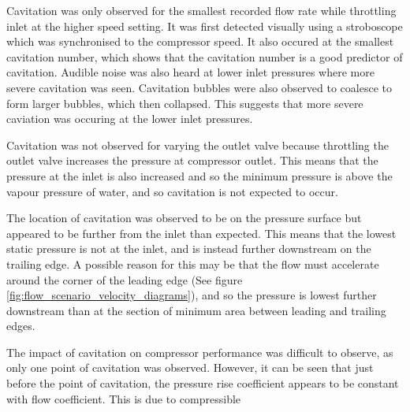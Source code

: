 \documentclass{article}
\begin{document}

Cavitation was only observed for the smallest recorded flow rate while throttling inlet at the higher speed setting.
It was first detected visually using a stroboscope which was synchronised to the compressor speed.
It also occured at the smallest cavitation number, which shows that the cavitation number is a good predictor of cavitation.
Audible noise was also heard at lower inlet pressures where more severe cavitation was seen.
Cavitation bubbles were also observed to coalesce to form larger bubbles, which then collapsed.
This suggests that more severe caviation was occuring at the lower inlet pressures.

Cavitation was not observed for varying the outlet valve because throttling the outlet valve increases the pressure at compressor outlet.
This means that the pressure at the inlet is also increased and so the minimum pressure is above the vapour pressure of water,
and so cavitation is not expected to occur.

The location of cavitation was observed to be on the pressure surface but appeared to be further from the inlet than expected.
This means that the lowest static pressure is not at the inlet, and is instead further downstream on the trailing edge.
A possible reason for this may be that the flow must accelerate around the corner of the leading edge (See figure \ref{fig:flow_scenario_velocity_diagrams}), and so the pressure is
lowest further downstream than at the section of minimum area between leading and trailing edges.

The impact of cavitation on compressor performance was difficult to observe, as only one point of cavitation was observed.
However, it can be seen that just before the point of cavitation, the pressure rise coefficient appears to be constant with flow coefficient.
This is due to compressible 

\end{document}
